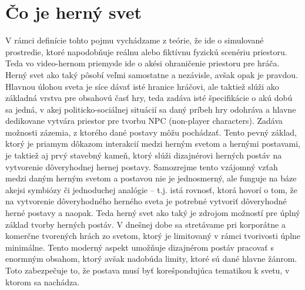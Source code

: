 \documentclass[10pt,twoside,slovak,a4paper]{article}
\begin{document}





\section{Čo je herný svet} \label{2.0}
V rámci definície tohto pojmu vychádzame z teórie, že ide o simulované prostredie, ktoré napodobňuje reálnu alebo fiktívnu fyzickú scenériu priestoru.\cite{FacesOfRP:MPD} Teda vo video-hernom priemysle ide o akési ohraničenie priestoru pre hráča. Herný svet ako taký pôsobí veľmi samostatne a nezávisle, avšak opak je pravdou. Hlavnou úlohou sveta je síce dávať isté hranice hráčovi, ale taktiež slúži ako základná vrstva pre obsahovú časť hry, teda zadáva isté špecifikácie o akú dobú sa jedná, v akej politicko-sociálnej situácií sa daný príbeh hry odohráva a hlavne dedikovane vytvára priestor pre tvorbu NPC (non-player characters). Zadáva možnosti zázemia, z ktorého dané postavy môžu pochádzať. Tento pevný základ, ktorý je priamym dôkazom interakcií medzi herným svetom a hernými postavami,  je taktiež aj prvý stavebný kameň, ktorý slúži dizajnérovi herných postáv na vytvorenie dôveryhodnej hernej postavy. Samozrejme tento vzájomný vzťah medzi daným herným svetom a postavou nie je jednosmerný, ale funguje na báze akejsi symbiózy či jednoduchej analógie – t.j. istá rovnosť, ktorá hovorí o tom, že na vytvorenie dôveryhodného herného sveta je potrebné vytvoriť dôveryhodné herné postavy a naopak. Teda herný svet ako taký je zdrojom možností pre úplný základ tvorby herných postáv. V dnešnej dobe sa stretávame pri korporátne a komerčne tvorených hrách zo svetom, ktorý je limitovaný v rámci tvorivosti úplne minimálne. Tento moderný aspekt umožňuje dizajnérom postáv pracovať s enormným obsahom, ktorý avšak nadobúda limity, ktoré sú dané hlavne žánrom. Toto zabezpečuje to, že postava musí byť korešpondujúca tematikou k svetu, v ktorom sa nachádza.
\end{document}
